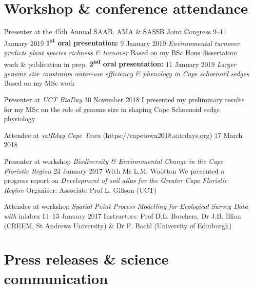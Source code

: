 \documentclass[10pt]{article}
\begin{document}
\section*{Workshop \& conference attendance} %

\begin{hangparas}{2em}{1}

Presenter at the 45th Annual SAAB, AMA \& SASSB Joint Congress
                                       \hfill {\small 9--11 January 2019} \break
\textbf{1\textsuperscript{st} oral presentation:}
                                           \hfill {\small 9 January 2019} \break
\textit{Environmental turnover predicts plant species richness \& turnover}
\break
Based on my BSc Hons dissertation work \& publication in prep. \break
\textbf{2\textsuperscript{nd} oral presentation:}
                                          \hfill {\small 11 January 2019} \break
\textit{Larger genome size constrains water-use efficiency \& phenology in 
Cape schoenoid sedges} \break
Based on my MSc work

Presenter at \textit{UCT BioDay}         \hfill {\small 30 November 2018} \break
I presented my preliminary results for my MSc on the role of genome size in 
shaping Cape Schoenoid sedge physiology

Attendee at \textit{satRday Cape Town} (https://capetown2018.satrdays.org)
                                                   \hfill {\small 17 March 2018}

Presenter at workshop \textit{Biodiversity \& Environmental Change in the Cape 
Floristic Region}                         \hfill {\small 24 January 2017} \break
With Ms L.M. Wootton \break
We presented a progress report on \textit{Development of soil atlas for the 
Greater Cape Floristic Region} \break
Organiser: Associate Prof L. Gillson (UCT)

Attendee at workshop \textit{Spatial Point Process Modelling for Ecological 
Survey Data with} inlabru             \hfill {\small 11--13 January 2017} \break
Instructors: Prof D.L. Borchers, Dr J.B. Illian (CREEM, St Andrews University) 
\& Dr F. Bachl (University of Edinburgh)

\hfill

\end{hangparas}

\section*{Press releases \& science communication} %
\end{document}
